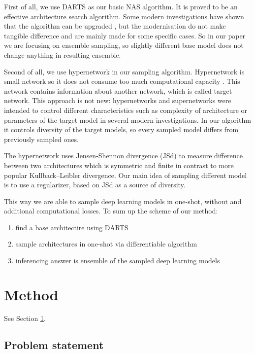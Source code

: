 \documentclass{article}
\begin{document}
First of all, we use DARTS \citep{darts} as our basic NAS algorithm. It is proved to be an effective architecture search algorithm. Some
modern investigations have shown that the algorithm can be upgraded \citep{p-darts, sdarts, darts-}, but the modernisation do not make tangible difference
and are mainly made for some specific cases. So in our paper we are focusing on ensemble sampling, so slightly different base
model does not change anything in resulting ensemble.

Second of all, we use hypernetwork in our sampling algorithm. Hypernetwork is small network so it does not
consume too much computational capacity \citep{hypernetworks}. This network contains information about another network, which is called target network.
This approach is not new: hypernetworks and supernetworks were intended to control different characteristics such as
complexity of architecture \citep{darts-cc} or parameters of the target model \citep{cont-learn} in several modern investigations. In our algorithm it controls 
diversity of the target models, so every sampled model differs from previously sampled ones.

The hypernetwork uses Jensen-Shennon divergence (JSd) to measure difference between two architectures which is symmetric and finite
in contrast to more popular Kullback–Leibler divergence. Our main idea of sampling different model is to use a regularizer,
based on JSd as a source of diversity.

This way we are able to sample deep learning models in one-shot, without and additional computational losses.
To sum up the scheme of our method:
\begin{enumerate} 
    \item find a base architectire using DARTS
    \item sample architectures in one-shot via differentiable algorithm
    \item inferencing answer is ensemble of the sampled deep learning models
\end{enumerate}


\section{Method}
\label{sec:headings}

See Section \ref{sec:headings}.

\subsection{Problem statement}
\end{document}
